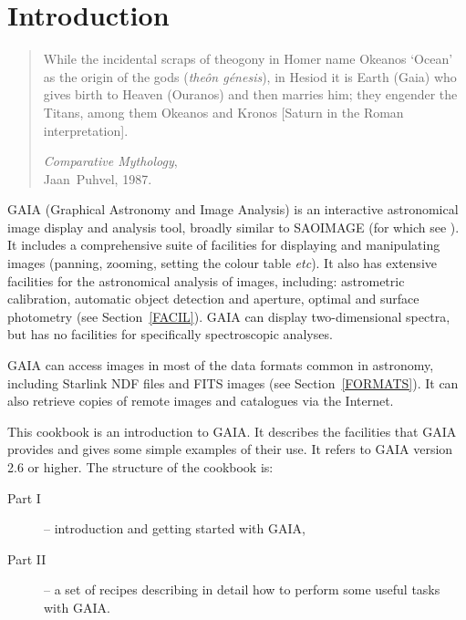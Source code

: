 \documentclass[twoside,11pt]{starlink}
\begin{document}
\scfrontmatter

\section{\label{INTRO}Introduction}

\begin{quote}
While the incidental scraps of theogony in Homer name Okeanos `Ocean' as
the origin of the gods (\textit{the\^{o}n g\'{e}nesis}\/), in Hesiod it is
Earth (Gaia) who gives birth to Heaven (Ouranos) and then marries him;
they engender the Titans, among them Okeanos and Kronos [Saturn in the
Roman interpretation].

\textit{Comparative Mythology},   \raggedleft \\
Jaan~Puhvel, 1987.             \raggedleft
\end{quote}

GAIA (Graphical Astronomy and Image Analysis) is an interactive
astronomical image display and analysis tool, broadly similar to SAOIMAGE
(for which see \cite{SUN166}).  It includes a
comprehensive suite of facilities for displaying and manipulating images
(panning, zooming, setting the colour table \emph{etc}\/).  It also has
extensive facilities for the astronomical analysis of images, including:
astrometric calibration, automatic object detection and aperture, optimal
and surface photometry (see Section~\ref{FACIL}).  GAIA can display
two-dimensional spectra, but has no facilities for specifically
spectroscopic analyses.

GAIA can access images in most of the data formats common in astronomy,
including Starlink NDF files and FITS images (see Section~\ref{FORMATS}).
It can also retrieve copies of remote images and catalogues via the
Internet.

This cookbook is an introduction to GAIA.  It describes the facilities
that GAIA provides and gives some simple examples of their use.  It
refers to GAIA version 2.6 or higher.  The structure of the cookbook is:

\begin{description}

  \item[{\rm Part I}] -- introduction and getting started with GAIA,

  \item[{\rm Part II}] -- a set of recipes describing in detail how to
   perform some useful tasks with GAIA.

\end{description}
\end{document}
